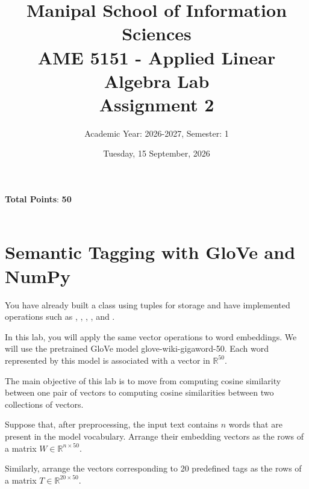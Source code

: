 \documentclass[12pt]{article}
\title{Manipal School of Information Sciences\\AME 5151 - Applied Linear Algebra Lab\vspace*{1em}\\Assignment 2\\}
\author{Academic Year: 2026-2027, Semester: 1}
\date{Tuesday, 15 September, 2026}
\begin{document}
\pagecolor{white!2}

\maketitle

\vspace*{-1em}\noindent{\color{black!70}{\rule{\textwidth}{0.8pt}}}

{}

\vspace*{1.5em}
\noindent\hfill {\textbf{Total Points}: \textbf{50}}
\vspace*{-4pt}\\
\noindent{\color{black!70}{\rule{\textwidth}{0.8pt}}}\\

\section*{Semantic Tagging with GloVe and NumPy}

You have already built a {\color{blue}{Vector}} class using tuples for
storage and have implemented operations such as
{\color{blue}{add}}, {\color{blue}{scale}}, {\color{blue}{dot}}, {\color{blue}{norm}}, and
{\color{blue}{cosine\_similarity}}.

In this lab, you will apply the same vector operations to
word embeddings. We will use the pretrained GloVe model
glove-wiki-gigaword-50. Each word represented by this model is
associated with a vector in $\mathbb{R}^{50}$.

The main objective of this lab is to move from computing cosine
similarity between one pair of vectors to computing cosine similarities
between two collections of vectors.

Suppose that, after preprocessing, the input text contains \(n\) words
that are present in the model vocabulary. Arrange their embedding
vectors as the rows of a matrix $W \in \mathbb{R}^{n \times 50}$.

Similarly, arrange the vectors corresponding to 20 predefined tags as
the rows of a matrix $T \in \mathbb{R}^{20 \times 50}$.
\end{document}
